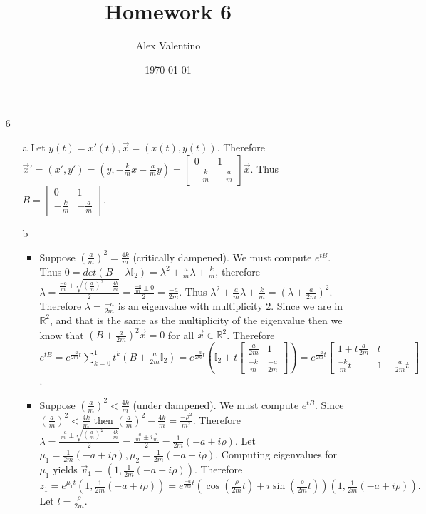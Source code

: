 \documentclass[12pt, letterpaper]{article}
\date{\today}
\author{Alex Valentino}
\title{Homework 6}
\newcommand{\R}{\mathbb{R}}
\begin{document}
\begin{enumerate}
	\item[6]
	\begin{enumerate}
		\item[a]
			Let $y(t) = x'(t), \Vec{x} = (x(t),y(t))$.  Therefore $\Vec{x}' = (x',y') = (y,-\frac{k}{m}x - \frac{a}{m}y) = \begin{bmatrix} 0 & 1 \\ -\frac{k}{m} & -\frac{a}{m}\end{bmatrix} \Vec{x}$.  Thus $B = \begin{bmatrix} 0 & 1 \\ -\frac{k}{m} & -\frac{a}{m}\end{bmatrix}$.
		\item[b]
			\begin{itemize}
				\item Suppose $(\frac{a}{m})^2 = \frac{4k}{m}$ (critically dampened). We must compute $e^{tB}$. Thus $0 = det(B - \lambda \mathbb{I}_2) = \lambda^2 + \frac{a}{m}\lambda +\frac{k}{m}$, therefore $\lambda = \frac{\frac{-a}{m} \pm \sqrt{(\frac{a}{m})^2 - \frac{4k}{m}}}{2} = \frac{\frac{-a}{m} \pm 0}{2} = \frac{-a}{2m}$.  Thus $\lambda^2 + \frac{a}{m}\lambda +\frac{k}{m} = (\lambda + \frac{a}{2m})^2$.  Therefore $\lambda = \frac{-a}{2m}$ is an eigenvalue with multiplicity 2.  Since we are in $\R^2$, and that is the same as the multiplicity of the eigenvalue then we know that $(B + \frac{a}{2m})^2 \Vec{x} = 0$ for all $\Vec{x} \in \R^2$.  Therefore $e^{tB} = e^{\frac{-a}{2m}t} \sum_{k=0}^1 t^k (B + \frac{a}{2m} \mathbb{I}_2) = e^{\frac{-a}{2m}t} (\mathbb{I}_2 + t \begin{bmatrix} \frac{a}{2m} & 1\\ \frac{-k}{m} &\frac{-a}{2m} \end{bmatrix} ) = e^{\frac{-a}{2m}t} \begin{bmatrix}1 + t\frac{a}{2m} & t\\ \frac{-k}{m}t & 1 - \frac{a}{2m}t \end{bmatrix}$.  
				\item Suppose $(\frac{a}{m})^2 < \frac{4k}{m}$ (under dampened).  We must compute $e^{tB}$.  Since $(\frac{a}{m})^2 < \frac{4k}{m}$ then $(\frac{a}{m})^2 - \frac{4k}{m} = \frac{-\rho^2}{m^2}$.  Therefore $\lambda =  \frac{\frac{-a}{m} \pm \sqrt{(\frac{a}{m})^2 - \frac{4k}{m}}}{2} = \frac{\frac{-a}{m} \pm i\frac{\rho}{m}}{2} = \frac{1}{2m}(-a\pm i \rho)$.  
				Let $\mu_1 = \frac{1}{2m}(-a + i \rho), \mu_2 =\frac{1}{2m}(-a - i \rho) $.  Computing eigenvalues for $\mu_1$ yields $\Vec{v}_1 = (1,\frac{1}{2m} (-a+i \rho))$.    Therefore $z_1 = e^{\mu_1 t} (1,\frac{1}{2m} (-a+i \rho)) = e^{\frac{-a}{2m}t} (\cos(\frac{\rho}{2m}t) + i \sin(\frac{\rho}{2m}t)) (1,\frac{1}{2m} (-a+i \rho)).$  Let $l = \frac{\rho}{2m}$.  \\

\end{itemize}
\end{enumerate}
\end{enumerate}
\end{document}
